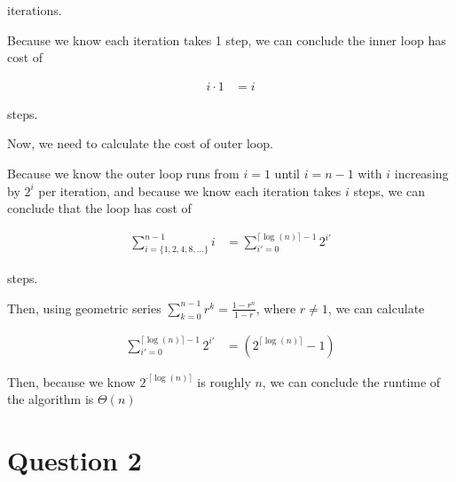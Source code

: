 \documentclass[12pt]{article}
\begin{document}
\begin{enumerate}[a.]
\begin{mdframed}
        iterations.

        \bigskip

        Because we know each iteration takes 1 step, we can conclude the inner
        loop has cost of

        \begin{align}
            i \cdot 1 &= i
        \end{align}

        steps.

        \bigskip

        Now, we need to calculate the cost of outer loop.

        \bigskip

        Because we know the outer loop runs from $i = 1$ until $i = n-1$ with $i$ increasing
        by $2^i$ per iteration, and because we know each iteration takes $i$ steps, we can
        conclude that the loop has cost of

        \color{red}
        \begin{align}
            \sum\limits_{i= \{1,2,4,8,\dots\}}^{n-1} i &= \sum\limits_{i'=0}^{\lceil \log (n) \rceil - 1} 2^{i'}
        \end{align}
        \color{black}

        steps.

        \bigskip

        Then, using geometric series $\sum\limits_{k=0}^{n-1} r^k = \frac{1-r^n}{1-r}$, where $r \neq 1$, we can calculate

        \color{red}
        \begin{align}
            \sum\limits_{i'=0}^{\lceil \log (n) \rceil - 1} 2^{i'} &= (2^{\lceil \log(n) \rceil} - 1)
        \end{align}
        \color{black}

        \bigskip

        Then, because we know \color{red}$2^{\cdot \lceil \log(n) \rceil}$\color{black}
        is roughly \color{red}$n$\color{black}, we can conclude the runtime of the
        algorithm is $\Theta(n)$

    \end{mdframed}


\end{enumerate}

\section*{Question 2}
\end{document}
